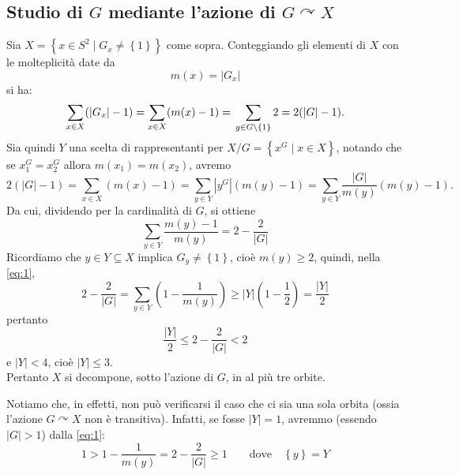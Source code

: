 \subsection{Studio di $G$ mediante l'azione di $G\curvearrowright X$}
Sia $X=\left\{x\in S^2 \mid G_x\neq\left\{1\right\}\right\}$ come sopra. Conteggiando gli elementi di $X$ con le molteplicit\`a date da
\begin{equation*}
m(x)=\left|G_x\right|
\end{equation*}
si ha:
\begin{equation*}
\sum_{x\in X}(\left|G_x\right|-1)=\sum_{x\in X}(m(x)-1)=\\
\sum_{g\in G\setminus\left\{1\right\}}2=2(\left|G\right|-1).
\end{equation*}
Sia quindi $Y$ una scelta di rappresentanti per $X/G=\left\{x^G\mid x\in X\right\}$, notando che se $x_1^G=x_2^G$ allora
$m(x_1)=m(x_2)$, avremo
\begin{equation*}
2(\left| G\right|-1)=\sum_{x\in X}(m(x)-1)=\sum_{y\in Y}\left|y^G\right|(m(y)-1)=\sum_{y\in Y}\frac{\left|G\right|}{m(y)}(m(y)-1).
\end{equation*}
Da cui, dividendo per la cardinalit\`a di $G$, si ottiene
\begin{equation} \label{eq:1}
\sum_{y\in Y}\frac{m(y)-1}{m(y)}=2-\frac{2}{\left|G\right|}
\end{equation}
Ricordiamo che $y\in Y\subseteq X$ implica $G_y\neq\left\{1\right\}$, cio\`e $m(y)\geq 2$, quindi, nella \ref{eq:1},
\begin{equation*}
2-\frac{2}{\left| G\right|}=\sum_{y\in Y}(1-\frac{1}{m(y)})\geq\left|Y\right|(1-\frac{1}{2})=\frac{\left|Y\right|}{2}
\end{equation*}
pertanto
\begin{equation*}
\frac{\left|Y\right|}{2}\leq 2-\frac{2}{\left|G\right|}<2
\end{equation*}
e $\left|Y\right|<4$, cio\`e $\left|Y\right|\leq 3$.\\
Pertanto $X$ si decompone, sotto l'azione di $G$, in al pi\`u tre orbite.\\
\begin{oss}
Notiamo che, in effetti, non pu\`o verificarsi il caso che ci sia una sola orbita (ossia l'azione $G\curvearrowright X$ non \`e transitiva).
Infatti, se fosse $\left|Y\right|=1$, avremmo (essendo $\left|G\right|>1$) dalla \ref{eq:1}:
\begin{equation*}
1>1-\frac{1}{m(y)}=2-\frac{2}{\left|G\right|}\geq 1\qquad\text{dove}\quad\left\{y\right\}=Y
\end{equation*}
\end{oss}

